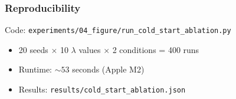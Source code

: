 \subsubsection{Reproducibility}

Code: \texttt{experiments/04\_figure/run\_cold\_start\_ablation.py}

\begin{itemize}[noitemsep]
    \item 20 seeds $\times$ 10 $\lambda$ values $\times$ 2 conditions = 400 runs
    \item Runtime: ${\sim}53$ seconds (Apple M2)
    \item Results: \texttt{results/cold\_start\_ablation.json}
\end{itemize}

